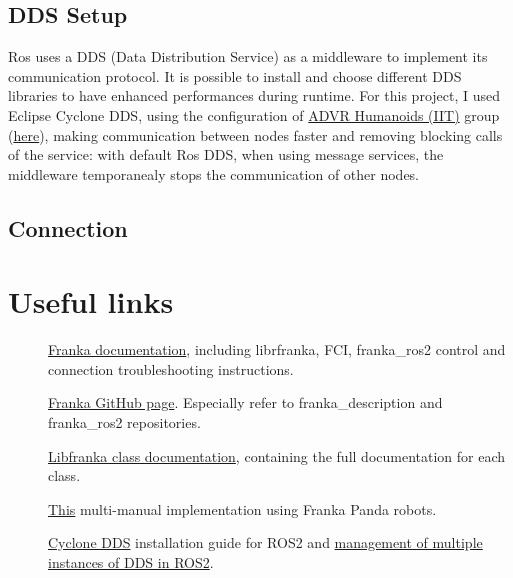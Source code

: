 \documentclass{article}
\begin{document}
\subsection{DDS Setup}
Ros uses a DDS (Data Distribution Service) as a middleware to implement its communication protocol. It is possible to install and choose different DDS libraries to have enhanced performances during runtime. For this project, I used Eclipse Cyclone DDS, using the configuration of \href{https://github.com/ADVRHumanoids}{ADVR Humanoids (IIT)} group (\href{https://github.com/ADVRHumanoids/ros2_config}{here}), making communication between nodes faster and removing blocking calls of the service: with default Ros DDS, when using message services, the middleware temporanealy stops the communication of other nodes.  

\subsection{Connection}

\section{Useful links}
\begin{description}
    \item[] \href{https://frankarobotics.github.io/docs/index.html}{Franka documentation}, including librfranka, FCI, franka\_ros2 control and connection troubleshooting instructions.
    \item[] \href{https://github.com/frankarobotics}{Franka GitHub page}. Especially refer to franka\_description and franka\_ros2 repositories.
    \item[] \href{https://frankarobotics.github.io/libfranka/0.15.0/}{Libfranka class documentation}, containing the full documentation for each class.
    \item[] \href{https://github.com/yilmazabdurrah/multi_franka_arm_ros2}{This} multi-manual implementation using Franka Panda robots.

    \item[] \href{https://docs.ros.org/en/humble/Installation/RMW-Implementations/DDS-Implementations/Working-with-Eclipse-CycloneDDS.html}{Cyclone DDS} installation guide for ROS2 and \href{https://docs.ros.org/en/humble/How-To-Guides/Working-with-multiple-RMW-implementations.html}{management of multiple instances of DDS in ROS2}.
\end{description}
\end{document}
